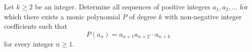 Let $k \geq 2$ be an integer. Determine all sequences of positive integers $a_1, a_2, \ldots$ for which there exists a monic polynomial $P$ of degree $k$ with non-negative integer coefficients such that
\[ P(a_n) = a_{n+1} a_{n+2} \cdots a_{n+k} \]
for every integer $n \geq 1$.
